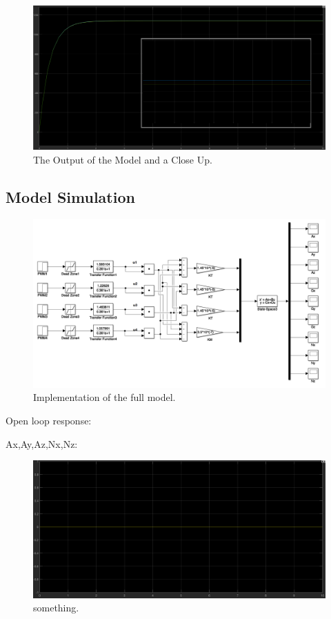 \begin{figure}[H]
  \centering
    \includegraphics[width=1\textwidth]{images/scopewithcloseup.png}
	\caption{The Output of the Model and a Close Up.}
	\label{motorScope}
\end{figure}

\subsection{Model Simulation}

\begin{figure}[H]
  \centering
    \includegraphics[width=1\textwidth]{images/openloop.png}
	\caption{Implementation of the full model.}
	\label{openloop}
\end{figure}

Open loop response:

Ax,Ay,Az,Nx,Nz:

\begin{figure}[H]
  \centering
    \includegraphics[width=1\textwidth]{images/Ax.png}
	\caption{something.}
	\label{openloop1}
\end{figure}

